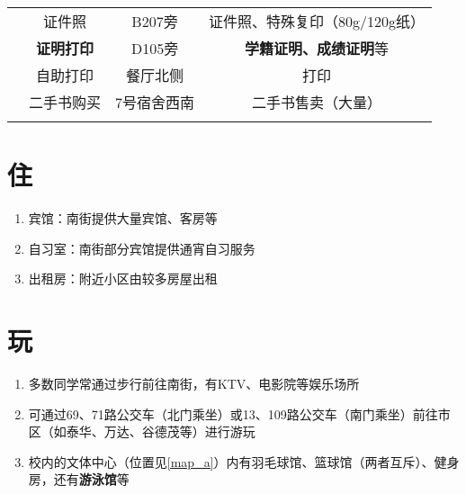 \begin{table}[!ht]
\begin{tabular}{|c|c|c|c|}
        \Xhline{1.2pt}
        \multirow{4}{*}{其他}   & 证件照                & B207旁  & 证件照、特殊复印（80g/120g纸）       \\
        \cline{2-4}
                              & \textbf{证明打印}      & D105旁  & \textbf{学籍证明、成绩证明}等       \\
        \cline{2-4}
                              & 自助打印               & 餐厅北侧   & 打印                        \\
        \cline{2-4}
                              & 二手书购买              & 7号宿舍西南 & 二手书售卖（大量）                 \\
        \Xhline{1.2pt}
    \end{tabular}
\end{table}

\section[住]{住}
\begin{enumerate}
    \item 宾馆：南街提供大量宾馆、客房等
    \item 自习室：南街部分宾馆提供通宵自习服务
    \item 出租房：附近小区由较多房屋出租\footnotemark
\end{enumerate}

\section[玩]{玩}
\begin{enumerate}
    \item 多数同学常通过步行前往南街，有KTV、电影院等娱乐场所
    \item 可通过69、71路公交车（北门乘坐）或13、109路公交车（南门乘坐）前往市区（如泰华、万达、谷德茂等）进行游玩
    \item 校内的文体中心\footnotemark（位置见\ref{map_a}）内有羽毛球馆、篮球馆（两者互斥\footnotemark）、健身房，还有\textbf{游泳馆}等
\end{enumerate}